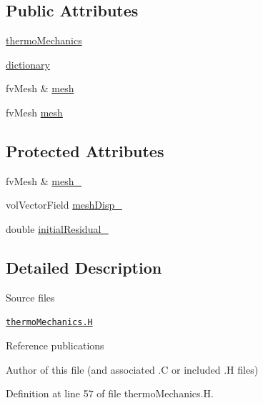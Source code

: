 \subsection*{Public Attributes}
\begin{DoxyCompactItemize}
\item 
\hyperlink{classFoam_1_1thermoMechanics_af9d1fda21720906cee15bb57e824a4d5}{thermo\+Mechanics}
\item 
\hyperlink{classFoam_1_1thermoMechanics_a7f92537ee0a432f6d2f27dd91f5e4257}{dictionary}
\item 
fv\+Mesh \& \hyperlink{classFoam_1_1thermoMechanics_a8bb1e58291d2d2b653e024a4f4bffe38}{mesh}
\item 
fv\+Mesh \hyperlink{classFoam_1_1thermoMechanics_a4d4b7c70f3733571fa826e1cdab24d39}{mesh}
\end{DoxyCompactItemize}
\subsection*{Protected Attributes}
\begin{DoxyCompactItemize}
\item 
fv\+Mesh \& \hyperlink{classFoam_1_1thermoMechanics_ad11fd245eb0e1a8279a432baf8530212}{mesh\+\_\+}
\item 
vol\+Vector\+Field \hyperlink{classFoam_1_1thermoMechanics_ad3f866f302400e3548accd7f6564518d}{mesh\+Disp\+\_\+}
\item 
double \hyperlink{classFoam_1_1thermoMechanics_afef1e0d20f5306533566a42f5cfbe3af}{initial\+Residual\+\_\+}
\end{DoxyCompactItemize}


\subsection{Detailed Description}
\label{_Description}%
 \begin{DoxyParagraph}{Source files}

\begin{DoxyItemize}
\item \href{../../../home/carlo/data/GeN-Foam/GeN-Foam_ffn/GeN-Foam/GeN-Foam/classes/thermoMechanics/thermoMechanics.H}{\tt thermo\+Mechanics.\+H} 
\end{DoxyItemize}Reference publications
\end{DoxyParagraph}
Author of this file (and associated .C or included .H files) 

Definition at line 57 of file thermo\+Mechanics.\+H.



